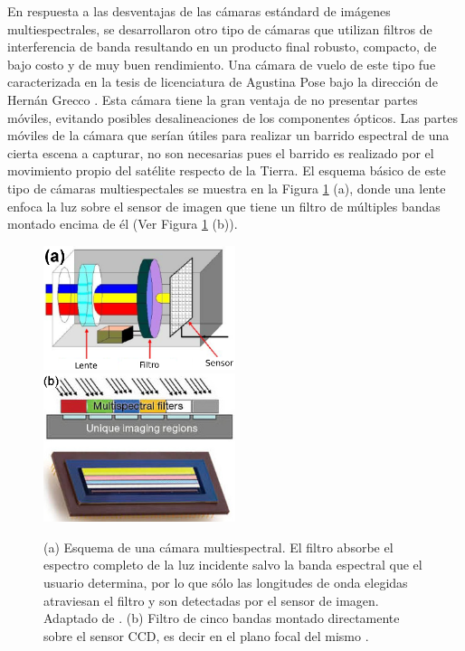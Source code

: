 En respuesta a las desventajas de las cámaras estándard de imágenes multiespectrales, se desarrollaron otro tipo de cámaras que utilizan filtros de interferencia de banda resultando en un producto final robusto, compacto, 
de bajo costo y de muy buen rendimiento. Una cámara de vuelo de este tipo fue caracterizada en la tesis de licenciatura de Agustina Pose bajo la dirección de Hernán Grecco \cite{Pose2017}. 
Esta cámara tiene la gran ventaja de no presentar partes móviles, 
evitando posibles desalineaciones de los componentes ópticos. Las partes 
móviles de la cámara que serían útiles para realizar un barrido espectral de 
una cierta escena a capturar, no son necesarias pues el barrido es realizado 
por el movimiento propio del satélite respecto de la Tierra. El esquema básico 
de este tipo de 
cámaras multiespectales se muestra 
en la Figura \ref{fig:esquemcamypegfilt} (a), donde una lente enfoca la luz sobre el sensor de imagen que tiene un filtro de múltiples bandas montado encima de él (Ver Figura \ref{fig:esquemcamypegfilt} (b)).


\begin{figure}[H]
\centering
\includegraphics[width=0.5\textwidth]{Figs/plan_de_tesis/cam_sens.png}\hfill
\includegraphics[width=0.5\textwidth]{Figs/introduccion/teled.png}
\caption{(a) Esquema de una cámara multiespectral. El filtro absorbe el espectro completo de la luz incidente salvo la banda espectral que el usuario determina, por lo que sólo las longitudes de onda elegidas atraviesan el filtro y son detectadas por el sensor de imagen. Adaptado de \cite{Martinez2008}. (b) Filtro de cinco bandas montado directamente sobre el sensor CCD, es decir en el plano focal del mismo \cite{sensarrib}.}
\label{fig:esquemcamypegfilt}
\end{figure}


